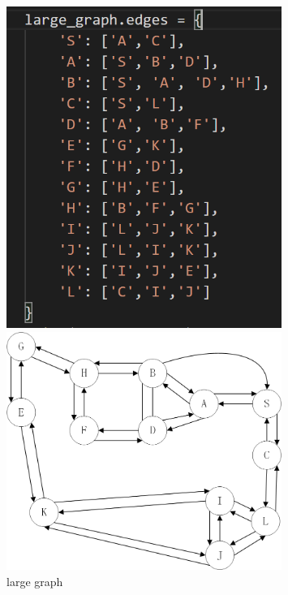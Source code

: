 \documentclass[aps,letterpaper,10pt]{revtex4}
\begin{document}
\begin{figure}[h]
	\begin{minipage}[c]{0.4\textwidth} %
		\centering
		\includegraphics[width=0.8\textwidth]{large_graph.png} %
	\end{minipage}%
	\begin{minipage}[c]{0.4\textwidth} %
		\centering
		\includegraphics[width=0.8\textwidth]{large_graph_visual.png} %
		
	\end{minipage}%
	\caption{large graph}
\end{figure}
\end{document}
